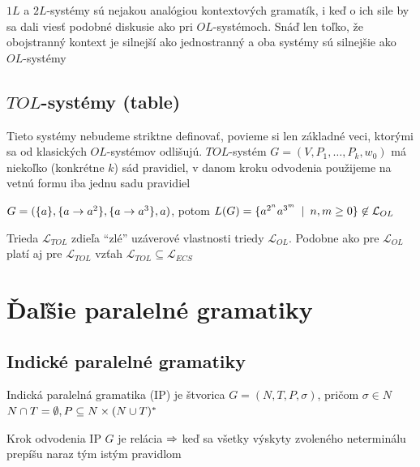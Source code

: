 \begin{poznamka}
  $1L$ a $2L$-systémy sú nejakou analógiou kontextových gramatík, i
  keď o ich sile by sa dali viesť podobné diskusie ako pri
  $OL$-systémoch. Snáď len toľko, že obojstranný kontext je silnejší
  ako jednostranný a oba systémy sú silnejšie ako $OL$-systémy
\end{poznamka}

\subsection{$TOL$-systémy (table)}

Tieto systémy nebudeme striktne definovať, povieme si len základné
veci, ktorými sa od kla\-sic\-kých $OL$-systémov odlišujú.
$TOL$-systém $G=(V,P_{1},\dots,P_{k},w_{0})$ má niekoľko
(konkrétne $k$) sád pravidiel, v danom kroku odvodenia použijeme
na vetnú formu iba jednu sadu pravidiel

\begin{priklad}
  $G=(\{a\},\{a\rightarrow a^{2}\},\{a\rightarrow a^{3}\},a)$, potom
  $L(G)=\{a^{2^{n}}a^{3^{m}}\enspace |\enspace n,m\geq0\}\not\in\mathcal{L}_{OL}$
\end{priklad}

\begin{poznamka}
  Trieda $\mathcal{L}_{TOL}$ zdieľa ``zlé'' uzáverové vlastnosti
  triedy $\mathcal{L}_{OL}$. Podobne ako pre $\mathcal{L}_{OL}$
  platí aj pre $\mathcal{L}_{TOL}$ vzťah
  $\mathcal{L}_{TOL}\subseteq\mathcal{L}_{ECS}$
\end{poznamka}

\section{Ďaľšie paralelné gramatiky}

\subsection{Indické paralelné gramatiky}

\begin{definicia}
  Indická paralelná gramatika (IP) je štvorica $G=(N,T,P,\sigma)$,
  pričom \mbox{$\sigma\in N$} $N\cap T=\emptyset, P\subseteq
  N\times(N\cup T)^{*}$
\end{definicia}

\begin{definicia}
  Krok odvodenia IP $G$ je relácia $\Rightarrow$ keď sa všetky výskyty
  zvoleného neterminálu prepíšu naraz tým istým pravidlom
\end{definicia}

